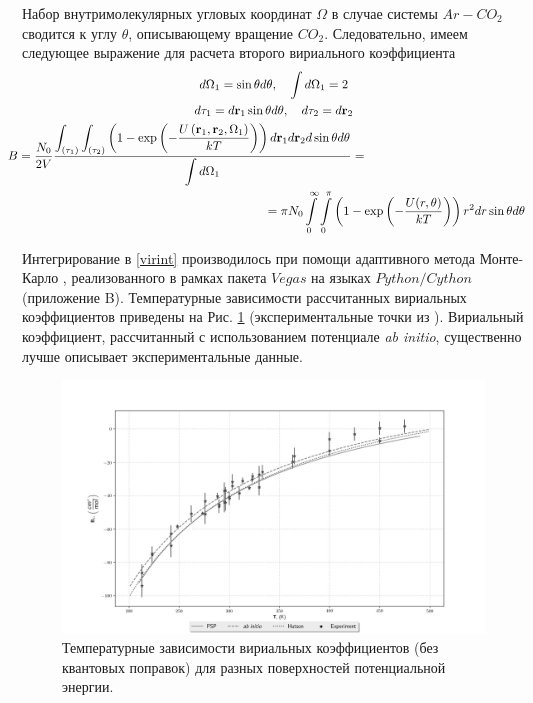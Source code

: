 Набор внутримолекулярных угловых координат $\Omega$ в случае системы $Ar-CO_2$ сводится к углу $\theta$, описывающему вращение $CO_2$. Следовательно, имеем следующее выражение для расчета второго вириального коэффициента
\vverh
\begin{gather}
	d \Omega_1 = \sin \theta d \theta, \quad \int d \Omega_1 = 2 \notag \\
	d \tau_1 = d \mathbf{r}_1 \sin \theta d \theta, \quad d \tau_2 = d \mathbf{r}_2 \notag \\
	\hspace*{-5cm} B = \frac{N_0}{2 V} \ddfrac{\int_{\lb \tau_1 \rb} \int_{\lb \tau_2 \rb} \lb 1 - \exp \lb -\frac{U \lb \mathbf{r}_1, \mathbf{r}_2, \Omega_1 \rb}{k T} \rb \rb d \mathbf{r}_1 d \mathbf{r}_2 d \sin \theta d \theta}{\int d \Omega_1} = \notag \\ \hspace{7cm} = \pi N_0 \int\limits_{0}^{\infty} \int\limits_{0}^{\pi} \lb 1 - \exp \lb - \frac{U(r, \theta)}{k T} \rb \rb r^2 d r \sin \theta d \theta \label{virint}
\end{gather}

Интегрирование в \eqref{virint} производилось при помощи адаптивного метода Монте-Карло \cite{lepage1978}, реализованного в рамках пакета $Vegas$ 
на языках $Python/Cython$ \cite{vegas} (приложение B). Температурные зависимости рассчитанных вириальных коэффициентов приведены на Рис. \ref{fig:vir} (экспериментальные точки из \cite{dymond}). Вириальный коэффициент, рассчитанный с использованием потенциале \textit{ab initio}, существенно лучше описывает экспериментальные данные. 

\begin{figure}[!ht]
\includegraphics[width=\linewidth]{pictures/virexp.png}
\caption{\centering Температурные зависимости вириальных коэффициентов (без квантовых поправок) для разных поверхностей потенциальной энергии. }
\label{fig:vir}
\end{figure}

